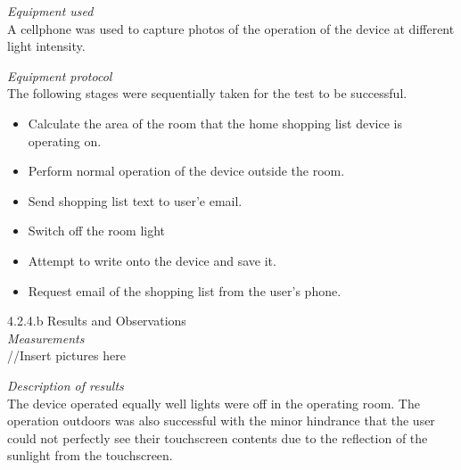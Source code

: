 \textit{Equipment used}\\
A cellphone was used to capture photos of the operation of the device at different light intensity.

\textit{Equipment protocol} \\
The following stages were sequentially taken for the test to be successful.
\begin{itemize}
	\item  Calculate the area of the room that the home shopping list device is operating on.
	\item Perform normal operation of the device outside the room.
	\item Send shopping list text to user'e email.
	\item  Switch off the room light
	\item Attempt to write onto the device and save it.
	\item  Request email of the shopping list from the user's phone.
\end{itemize}

4.2.4.b Results and Observations\\
\textit{Measurements}\\
//Insert pictures here

\textit{Description of results}\\
The device operated equally well lights were off in the operating room. The operation outdoors was also successful with the minor hindrance that the user could not perfectly see their touchscreen contents due to the reflection of the sunlight from the touchscreen.

\newpage



